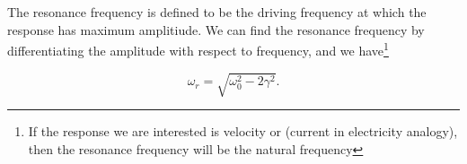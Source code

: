 \documentclass[english,a4paper,12pt]{report}
\begin{document}
{The resonance frequency is defined to be the driving frequency at which the response has maximum amplitiude. We can find the resonance frequency by differentiating the amplitude with respect to frequency, and we have\footnote{If the response we are interested is velocity or (current in electricity analogy), then the resonance frequency will be the natural frequency}

\begin{equation}
    \omega _{r} = \sqrt{\omega _{0}^2 - 2\gamma ^2 }.
\end{equation}

} 
\end{document}
